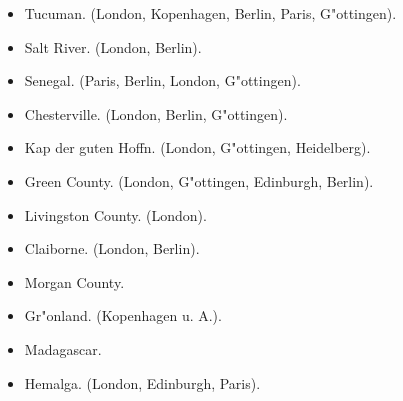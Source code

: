 \documentclass[a4paper, 11pt, oneside]{article}
\begin{document}
\begin{itemize}
\begin{itemize}
        \item Tucuman. (London, Kopenhagen, Berlin, Paris, G"ottingen).
    
        \item Salt River. (London, Berlin).
    
        \item Senegal. (Paris, Berlin, London, G"ottingen).
    
        \item Chesterville. (London, Berlin, G"ottingen).
    
        \item Kap der guten Hoffn. (London, G"ottingen, Heidelberg).
    
        \item Green County. (London, G"ottingen, Edinburgh, Berlin).
    
        \item Livingston County. (London).
    
        \item Claiborne. (London, Berlin).
    
        \item Morgan County.
    
        \item Gr"onland. (Kopenhagen u. A.).
    
        \item Madagascar.
    
        \item Hemalga. (London, Edinburgh, Paris).
    \end{itemize}
\end{itemize}
\clearpage
\end{document}
